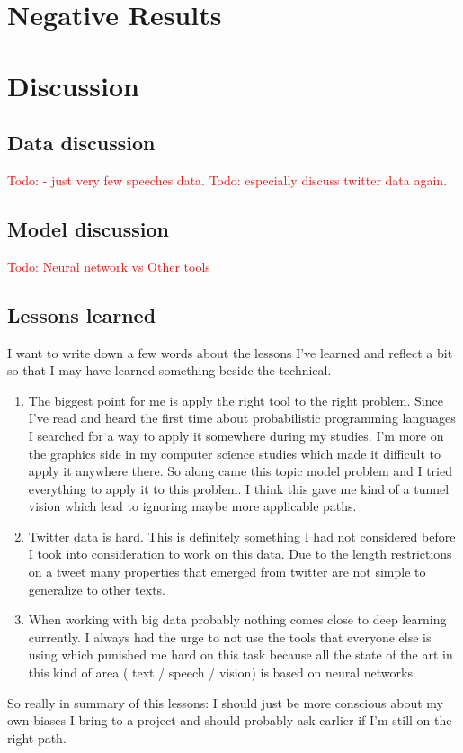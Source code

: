 \documentclass[10pt,conference,compsocconf]{IEEEtran}
\newcommand\todo[1]{\textcolor{red}{Todo: #1}}
\begin{document}
\section{Negative Results}


\section{Discussion}
\label{sec:Discussion}

\subsection{Data discussion}

\todo{- just very few speeches data. }
\todo{especially discuss twitter data again. }

\subsection{Model discussion}
\todo{Neural network vs Other tools}

\subsection{Lessons learned}
I want to write down a few words about the lessons I've learned and reflect a bit so that I may have learned something beside the technical. 
\begin{enumerate}
	\item The biggest point for me is apply the right tool to the right problem. Since I've read and heard the first time about probabilistic programming languages I searched for a way to apply it somewhere during my studies. I'm more on the graphics side in my computer science studies which made it difficult to apply it anywhere there. So along came this topic model problem and I tried everything to apply it to this problem. I think this gave me kind of a tunnel vision which lead to ignoring maybe more applicable paths.
	\item Twitter data is hard. This is definitely something I had not considered before I took into consideration to work on this data. Due to the length restrictions on a tweet many properties that emerged from twitter are not simple to generalize to other texts. 
	\item When working with big data probably nothing comes close to deep learning currently. I always had the urge to not use the tools that everyone else is using which punished me hard on this task because all the state of the art in this kind of area ( text / speech / vision) is based on neural networks. 
\end{enumerate}
So really in summary of this lessons: I should just be more conscious about my own biases I bring to a project and should probably ask earlier if I'm still on the right path. 
\end{document}
